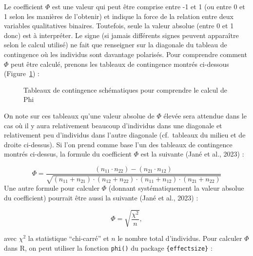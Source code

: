 \documentclass[
  letterpaper,
]{book}
\begin{document}
Le coefficient \(\Phi\) est une valeur qui peut être comprise entre -1
et 1 (ou entre 0 et 1 selon les manières de l'obtenir) et indique la
force de la relation entre deux variables qualitatives binaires.
Toutefois, seule la valeur absolue (entre 0 et 1 donc) est à
interpréter. Le signe (si jamais différents signes peuvent apparaître
selon le calcul utilisé) ne fait que renseigner sur la diagonale du
tableau de contingence où les individus sont davantage polarisés. Pour
comprendre comment \(\Phi\) peut être calculé, prenons les tableaux de
contingence montrés ci-dessous (Figure~\ref{fig-PhiContTables}) :

\begin{figure}


\caption{\label{fig-PhiContTables}Tableaux de contingence schématiques
pour comprendre le calcul de Phi}

\end{figure}%

On note sur ces tableaux qu'une valeur absolue de \(\Phi\) élevée sera
attendue dans le cas où il y aura relativement beaucoup d'individus dans
une diagonale et relativement peu d'individus dans l'autre diagonale
(cf.~tableaux du milieu et de droite ci-dessus). Si l'on prend comme
base l'un des tableaux de contingence montrés ci-dessus, la formule du
coefficient \(\Phi\) est la suivante (Jané et al., 2023) :

\[\Phi = \frac{(n_{11} \cdot n_{22}) - (n_{21} \cdot n_{12})}{\sqrt{(n_{11} + n_{21}) \cdot (n_{12} + n_{22}) \cdot (n_{11} + n_{12}) \cdot (n_{21} + n_{22})}}\]
Une autre formule pour calculer \(\Phi\) (donnant systématiquement la
valeur absolue du coefficient) pourrait être aussi la suivante (Jané et
al., 2023) :

\[\Phi = \sqrt{\frac{\chi^2}{n}},\]

avec \(\chi^2\) la statistique ``chi-carré'' et \(n\) le nombre total
d'individus. Pour calculer \(\Phi\) dans R, on peut utiliser la fonction
\texttt{phi()} du package \texttt{\{effectsize\}} :
\end{document}
